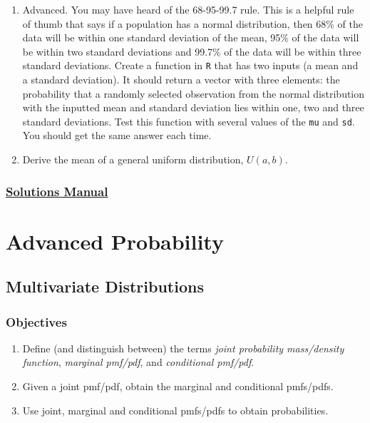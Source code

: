 \documentclass[
  letterpaper,
  DIV=11,
  numbers=noendperiod]{scrreprt}
\begin{document}
\begin{enumerate}
\def\labelenumi{\arabic{enumi}.}
\setcounter{enumi}{2}
\item
  Advanced. You may have heard of the 68-95-99.7 rule. This is a helpful
  rule of thumb that says if a population has a normal distribution,
  then 68\% of the data will be within one standard deviation of the
  mean, 95\% of the data will be within two standard deviations and
  99.7\% of the data will be within three standard deviations. Create a
  function in \texttt{R} that has two inputs (a mean and a standard
  deviation). It should return a vector with three elements: the
  probability that a randomly selected observation from the normal
  distribution with the inputted mean and standard deviation lies within
  one, two and three standard deviations. Test this function with
  several values of the \texttt{mu} and \texttt{sd}. You should get the
  same answer each time.
\item
  Derive the mean of a general uniform distribution, \(U(a,b)\).
\end{enumerate}

\section*{\texorpdfstring{\href{https://ds-usafa.github.io/CPS-Solutions-Manual/CONTNNAMED.html}{Solutions
Manual}}{Solutions Manual}}\label{solutions-manual-13}


\part{Advanced Probability}

\chapter{Multivariate Distributions}\label{MULTIDISTS}

\section{Objectives}\label{objectives-14}

\begin{enumerate}
\def\labelenumi{\arabic{enumi})}
\item
  Define (and distinguish between) the terms \emph{joint probability
  mass/density function}, \emph{marginal pmf/pdf}, and \emph{conditional
  pmf/pdf}.
\item
  Given a joint pmf/pdf, obtain the marginal and conditional pmfs/pdfs.
\item
  Use joint, marginal and conditional pmfs/pdfs to obtain probabilities.
\end{enumerate}
\end{document}

